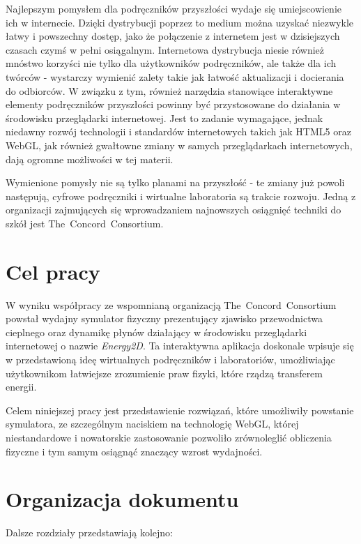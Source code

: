 Najlepszym pomysłem dla podręczników przyszłości wydaje się umiejscowienie ich w
internecie. Dzięki dystrybucji poprzez to medium można uzyskać niezwykle łatwy i
powszechny dostęp, jako że połączenie z internetem jest w dzisiejszych czasach
czymś w pełni osiągalnym. Internetowa dystrybucja niesie również mnóstwo
korzyści nie tylko dla użytkowników podręczników, ale także dla ich twórców -
wystarczy wymienić zalety takie jak łatwość aktualizacji i docierania do
odbiorców. W związku z tym, również narzędzia stanowiące interaktywne elementy
podręczników przyszłości powinny być przystosowane do działania w środowisku
przeglądarki internetowej. Jest to zadanie wymagające, jednak niedawny rozwój
technologii i standardów internetowych takich jak HTML5 oraz WebGL, jak również
gwałtowne zmiany w samych przeglądarkach internetowych, dają ogromne możliwości
w tej materii.

Wymienione pomysły nie są tylko planami na przyszłość - te zmiany już powoli
następują, cyfrowe podręczniki i wirtualne laboratoria są trakcie rozwoju. Jedną
z organizacji zajmujących się wprowadzaniem najnowszych osiągnięć techniki do
szkół jest \mbox{The Concord Consortium}.

\section{Cel pracy}
\label{sec:celPracy}

W wyniku współpracy ze wspomnianą organizacją \mbox{The Concord Consortium}
powstał wydajny symulator fizyczny prezentujący zjawisko przewodnictwa cieplnego
oraz dynamikę płynów działający w środowisku przeglądarki internetowej o nazwie
\emph{\mbox{Energy2D}}. Ta interaktywna aplikacja doskonale wpisuje się w
przedstawioną ideę wirtualnych podręczników i laboratoriów, umożliwiając
użytkownikom łatwiejsze zrozumienie praw fizyki, które rządzą transferem
energii.

Celem niniejszej pracy jest przedstawienie rozwiązań, które umożliwiły powstanie
symulatora, ze szczególnym naciskiem na technologię WebGL, której niestandardowe
i nowatorskie zastosowanie pozwoliło zrównoleglić obliczenia fizyczne i tym
samym osiągnąć znaczący wzrost wydajności.

\section{Organizacja dokumentu}
\label{sec:organizacjaDokumentu}

Dalsze rozdziały przedstawiają kolejno:

